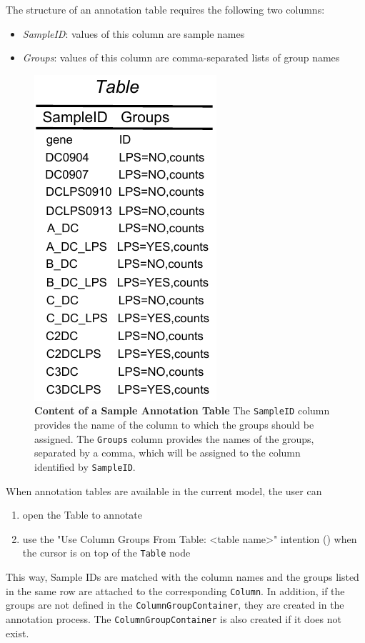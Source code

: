 The structure of an annotation table requires the following two columns: 
\begin{itemize}
\item \textit{SampleID}: values of this column are sample names
\item \textit{Groups}: values of this column are comma-separated lists of group names
\end{itemize}
\begin{figure}
  \centering
  \includegraphics[width=\figWidthTiny]{figures/AnnotationTableSample.pdf}
\caption[Content of a Sample Annotation Table]{\textbf{Content of a Sample Annotation Table} The \texttt{SampleID} column provides the name of the column to which the groups should be assigned. The \texttt{Groups} column provides the names of the groups, separated by a comma, which will be assigned to the column identified by \texttt{SampleID}.}
\label{fig:AnnotateTableSample}
\end{figure}


\noindent{}When annotation tables are available in the current model, the user can
\begin{enumerate}
\item  open the Table to annotate 
\item use the "Use Column Groups From Table: <table name>" intention (\intentionLightBulb) when the cursor is on top of the \texttt{Table} node
\end{enumerate}
This way, Sample IDs are matched with the column names and the groups listed in the same row are attached to the corresponding \texttt{Column}. In addition, if the groups are not defined in the \texttt{ColumnGroupContainer}, they are created in the annotation process. The \texttt{Column\allowbreak{}Group\allowbreak{}Container} is also created if it does not exist.


